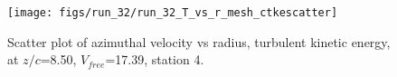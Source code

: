 \begin{figure}[H]
\centering
\texttt{[image: figs/run\_32/run\_32\_T\_vs\_r\_mesh\_ctkescatter]}
\caption{Scatter plot of azimuthal velocity vs radius, turbulent kinetic energy, at $z/c$=8.50, $V_{free}$=17.39, station 4.}
\label{fig:run_32_T_vs_r_mesh_ctkescatter}
\end{figure}


